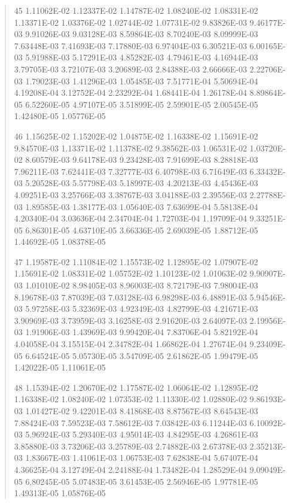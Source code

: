 \documentclass[letterpaper,10pt,english]{sphinxmanual}
\begin{document}
\begin{quote}
\begin{DUlineblock}{0em}
\item[] 45   1.11062E-02  1.12337E-02  1.14787E-02  1.08240E-02  1.08331E-02  1.13371E-02  1.03376E-02  1.02744E-02  1.07731E-02  9.83826E-03  9.46177E-03  9.91026E-03  9.03128E-03  8.59864E-03  8.70240E-03  8.09999E-03  7.63448E-03  7.41693E-03  7.17880E-03  6.97404E-03  6.30521E-03  6.00165E-03  5.91988E-03  5.17291E-03  4.85282E-03  4.79461E-03  4.16944E-03  3.79705E-03  3.72107E-03  3.20689E-03  2.84388E-03  2.66666E-03  2.22706E-03  1.79023E-03  1.41296E-03  1.05485E-03  7.51771E-04  5.50694E-04  4.19208E-04  3.12752E-04  2.23292E-04  1.68441E-04  1.26178E-04  8.89864E-05  6.52260E-05  4.97107E-05  3.51899E-05  2.59901E-05  2.00545E-05  1.42480E-05  1.05776E-05
\item[] 46   1.15625E-02  1.15202E-02  1.04875E-02  1.16338E-02  1.15691E-02  9.84570E-03  1.13371E-02  1.11378E-02  9.38562E-03  1.06531E-02  1.03720E-02  8.60579E-03  9.64178E-03  9.23428E-03  7.91699E-03  8.28818E-03  7.96211E-03  7.62441E-03  7.32777E-03  6.40798E-03  6.71649E-03  6.33432E-03  5.20528E-03  5.57798E-03  5.18997E-03  4.20213E-03  4.45436E-03  4.09251E-03  3.25766E-03  3.38767E-03  3.04188E-03  2.39556E-03  2.27788E-03  1.89585E-03  1.38177E-03  1.05640E-03  7.63699E-04  5.58138E-04  4.20340E-04  3.03636E-04  2.34704E-04  1.72703E-04  1.19709E-04  9.33251E-05  6.86301E-05  4.63710E-05  3.66336E-05  2.69039E-05  1.88712E-05  1.44692E-05  1.08378E-05
\item[] 47   1.19587E-02  1.11084E-02  1.15573E-02  1.12895E-02  1.07907E-02  1.15691E-02  1.08331E-02  1.05752E-02  1.10123E-02  1.01063E-02  9.90907E-03  1.01010E-02  8.98405E-03  8.96003E-03  8.72179E-03  7.98004E-03  8.19678E-03  7.87039E-03  7.03128E-03  6.98298E-03  6.48891E-03  5.94546E-03  5.97258E-03  5.32369E-03  4.92349E-03  4.82799E-03  4.21671E-03  3.90969E-03  3.73959E-03  3.16258E-03  2.91620E-03  2.64097E-03  2.19956E-03  1.91906E-03  1.43969E-03  9.99420E-04  7.83706E-04  5.82192E-04  4.04058E-04  3.15515E-04  2.34782E-04  1.66862E-04  1.27674E-04  9.23409E-05  6.64524E-05  5.05730E-05  3.54709E-05  2.61862E-05  1.99479E-05  1.42022E-05  1.11061E-05
\item[] 48   1.15394E-02  1.20670E-02  1.17587E-02  1.06064E-02  1.12895E-02  1.16338E-02  1.08240E-02  1.07353E-02  1.11330E-02  1.02880E-02  9.86193E-03  1.01427E-02  9.42201E-03  8.41868E-03  8.87567E-03  8.64543E-03  7.88424E-03  7.59523E-03  7.58612E-03  7.03842E-03  6.11244E-03  6.10092E-03  5.96924E-03  5.29340E-03  4.95014E-03  4.84295E-03  4.26861E-03  3.85880E-03  3.73206E-03  3.25789E-03  2.74882E-03  2.67378E-03  2.35213E-03  1.83667E-03  1.41061E-03  1.06753E-03  7.62838E-04  5.67407E-04  4.36625E-04  3.12749E-04  2.24188E-04  1.73482E-04  1.28529E-04  9.09049E-05  6.80245E-05  5.07483E-05  3.61453E-05  2.56946E-05  1.97781E-05  1.49313E-05  1.05876E-05

\end{DUlineblock}
\end{quote}
\end{document}

